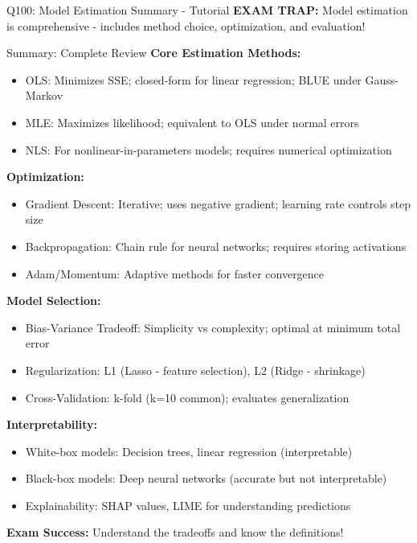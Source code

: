 \documentclass[8pt]{beamer}
\begin{document}
\begin{frame}{Q100: Model Estimation Summary - Tutorial}
		\textcolor{myred}{\textbf{EXAM TRAP:}} Model estimation is comprehensive - includes method choice, optimization, and evaluation!
	\end{frame}
	
	
	\begin{frame}{Summary: Complete Review}
		\fontsize{6.5}{7.5}\selectfont
		\textbf{\textcolor{myblue}{Core Estimation Methods:}}
		\begin{itemize}
			\item \textcolor{myblue}{OLS:} Minimizes SSE; closed-form for linear regression; BLUE under Gauss-Markov
			\item \textcolor{myblue}{MLE:} Maximizes likelihood; equivalent to OLS under normal errors
			\item \textcolor{myblue}{NLS:} For nonlinear-in-parameters models; requires numerical optimization
		\end{itemize}
		
		\vspace{0.1cm}
		\textbf{\textcolor{myblue}{Optimization:}}
		\begin{itemize}
			\item \textcolor{myblue}{Gradient Descent:} Iterative; uses negative gradient; learning rate controls step size
			\item \textcolor{myblue}{Backpropagation:} Chain rule for neural networks; requires storing activations
			\item \textcolor{myblue}{Adam/Momentum:} Adaptive methods for faster convergence
		\end{itemize}
		
		\vspace{0.1cm}
		\textbf{\textcolor{myblue}{Model Selection:}}
		\begin{itemize}
			\item \textcolor{myblue}{Bias-Variance Tradeoff:} Simplicity vs complexity; optimal at minimum total error
			\item \textcolor{myblue}{Regularization:} L1 (Lasso - feature selection), L2 (Ridge - shrinkage)
			\item \textcolor{myblue}{Cross-Validation:} k-fold (k=10 common); evaluates generalization
		\end{itemize}
		
		\vspace{0.1cm}
		\textbf{\textcolor{myblue}{Interpretability:}}
		\begin{itemize}
			\item \textcolor{myblue}{White-box models:} Decision trees, linear regression (interpretable)
			\item \textcolor{myblue}{Black-box models:} Deep neural networks (accurate but not interpretable)
			\item \textcolor{myblue}{Explainability:} SHAP values, LIME for understanding predictions
		\end{itemize}
		
		\vspace{0.1cm}
		\textcolor{myred}{\textbf{Exam Success:}} Understand the tradeoffs and know the definitions!
	\end{frame}
	
\end{document}
